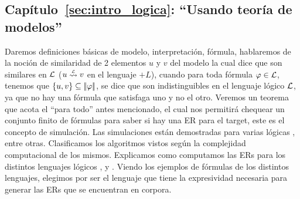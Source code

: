 \subsection{Cap\'itulo~\ref{sec:intro_logica}: ``Usando teor\'ia de modelos''} 
Daremos definiciones b\'asicas de modelo, 
interpretaci\'on, f\'ormula, hablaremos de la noci\'on de similaridad de 2 elementos $u$ y $v$ del modelo la cual dice que son 
similares en $\mathcal{L}$ ($u \simil{\+L} v$ en el lenguaje $+L$), cuando para toda f\'ormula $\varphi \in \mathcal{L}$, tenemos que 
$\{u,v\} \subseteq |\!|\varphi|\!|$, se dice que son indistinguibles en el lenguaje l\'ogico $\mathcal{L}$, ya que no hay una f\'ormula que satisfaga uno 
y no el otro. Veremos un teorema que acota el ``para todo'' antes mencionado, el cual nos permitir\'a chequear un conjunto finito de f\'ormulas para saber si hay una ER para el target, este es el concepto de simulaci\'on. Las simulaciones est\'an demostradas para varias l\'ogicas \ALC, \EL entre otras. Clasificamos los algoritmos vistos seg\'un la complejidad computacional de los mismos. Explicamos como computamos las ERs para los distintos lenguajes l\'ogicos \FOL, \ALC y \EL. Viendo los ejemplos de f\'ormulas de los distintos lenguajes, elegimos \EL por ser el lenguaje que tiene la expresividad necesaria para generar las ERs que se encuentran en corpora.%
%

